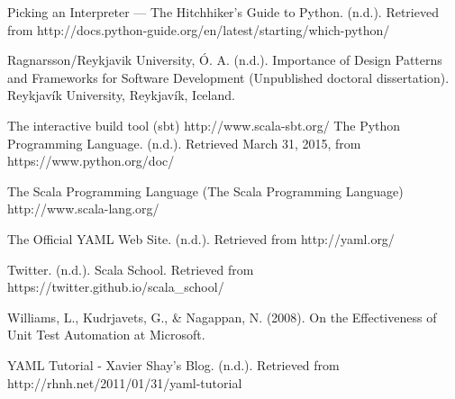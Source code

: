 \begin{thebibliography}{9}
 Picking an Interpreter — The Hitchhiker's Guide to Python. (n.d.). Retrieved from http://docs.python-guide.org/en/latest/starting/which-python/

Ragnarsson/Reykjavik University, Ó. A. (n.d.). Importance of Design Patterns and Frameworks for Software Development (Unpublished doctoral dissertation). Reykjavík University, Reykjavík, Iceland.

 The interactive build tool (sbt) http://www.scala-sbt.org/
The Python Programming Language. (n.d.). Retrieved March 31, 2015, from https://www.python.org/doc/

 The Scala Programming Language (The Scala Programming Language) http://www.scala-lang.org/

 The Official YAML Web Site. (n.d.). Retrieved from http://yaml.org/

 Twitter. (n.d.). Scala School. Retrieved from https://twitter.github.io/scala\_school/

 Williams, L., Kudrjavets, G., \& Nagappan, N. (2008). On the Effectiveness of Unit Test Automation at Microsoft.

 YAML Tutorial - Xavier Shay's Blog. (n.d.). Retrieved from http://rhnh.net/2011/01/31/yaml-tutorial

\end{thebibliography}
